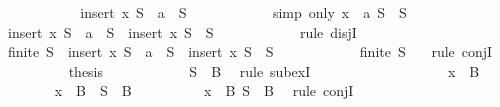 \begin{isabellebody}
\ \ \ \ \ \ \ \ \isamarkupfalse%
\ \isamarkupfalse%
\ {\isachardoublequoteopen}insert\ x\ S\ {\isacharequal}\ {\isacharbraceleft}a{\isacharbraceright}\ {\isasymunion}\ S{\isacharprime}{\isachardoublequoteclose}\isanewline
\ \ \ \ \ \ \ \ \ \ \isamarkupfalse%
\ {\isacharparenleft}simp\ only{\isacharcolon}\ {\isacartoucheopen}x\ {\isacharequal}\ a{\isacartoucheclose}\ {\isacartoucheopen}S\ {\isacharequal}\ S{\isacharprime}{\isacartoucheclose}{\isacharparenright}\isanewline
\ \ \ \ \ \ \ \ \isamarkupfalse%
\ \isamarkupfalse%
\ {}{\isacharcolon}{\isachardoublequoteopen}insert\ x\ S\ {\isacharequal}\ {\isacharbraceleft}a{\isacharbraceright}\ {\isasymunion}\ S{\isacharprime}\ {\isasymor}\ insert\ x\ S\ {\isacharequal}\ S{\isacharprime}{\isachardoublequoteclose}\isanewline
\ \ \ \ \ \ \ \ \ \ \isamarkupfalse%
\ {\isacharparenleft}rule\ disjI{}{\isacharparenright}\isanewline
\ \ \ \ \ \ \ \ \isamarkupfalse%
\ {\isachardoublequoteopen}finite\ S{\isacharprime}\ {\isasymand}\ {\isacharparenleft}insert\ x\ S\ {\isacharequal}\ {\isacharbraceleft}a{\isacharbraceright}\ {\isasymunion}\ S{\isacharprime}\ {\isasymor}\ insert\ x\ S\ {\isacharequal}\ S{\isacharprime}{\isacharparenright}{\isachardoublequoteclose}\isanewline
\ \ \ \ \ \ \ \ \ \ \isamarkupfalse%
\ {\isacartoucheopen}finite\ S{\isacharprime}{\isacartoucheclose}\ {}\ \isamarkupfalse%
\ {\isacharparenleft}rule\ conjI{\isacharparenright}\isanewline
\ \ \ \ \ \ \ \ \isamarkupfalse%
\ {\isacharquery}thesis\isanewline
\ \ \ \ \ \ \ \ \ \ \isamarkupfalse%
\ {\isacartoucheopen}S{\isacharprime}\ {\isasymsubseteq}\ B{\isacartoucheclose}\ \isamarkupfalse%
\ {\isacharparenleft}rule\ subexI{\isacharparenright}\isanewline
\ \ \ \ \ \ \isamarkupfalse%
\isanewline
\ \ \ \ \isamarkupfalse%
\isanewline
\ \ \ \ \ \ \isamarkupfalse%
\ {\isachardoublequoteopen}x\ {\isasymin}\ B{\isachardoublequoteclose}\isanewline
\ \ \ \ \ \ \isamarkupfalse%
\ {\isachardoublequoteopen}x\ {\isasymin}\ B\ {\isasymand}\ S{\isacharprime}\ {\isasymsubseteq}\ B{\isachardoublequoteclose}\isanewline
\ \ \ \ \ \ \ \ \isamarkupfalse%
\ {\isacartoucheopen}x\ {\isasymin}\ B{\isacartoucheclose}\ {\isacartoucheopen}S{\isacharprime}\ {\isasymsubseteq}\ B{\isacartoucheclose}\ \isamarkupfalse%
\ {\isacharparenleft}rule\ conjI{\isacharparenright}\isanewline

\end{isabellebody}
